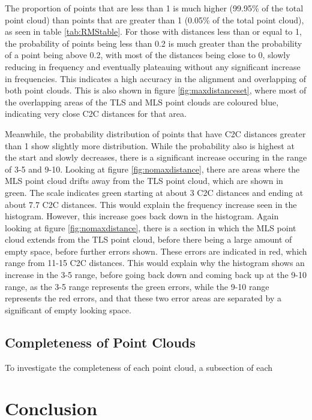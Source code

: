 \documentclass[man]{apa7}
\begin{document}
The proportion of points that are less than 1 is much higher (99.95\% of the total point cloud) than points that are greater than 1 (0.05\% of the total point cloud), as seen in table \ref{tab:RMStable}. For those with distances less than or equal to 1, the probability of points being less than 0.2 is much greater than the probability of a point being above 0.2, with most of the distances being close to 0, slowly reducing in frequency and eventually plateauing without any significant increase in frequencies. This indicates a high accuracy in the alignment and overlapping of both point clouds. This is also shown in figure \ref{fig:maxdistanceset}, where most of the overlapping areas of the TLS and MLS point clouds are coloured blue, indicating very close C2C distances for that area.

Meanwhile, the probability distribution of points that have C2C distances greater than 1 show slightly more distribution. While the probability also is highest at the start and slowly decreases, there is a significant increase occuring in the range of 3-5 and 9-10. Looking at figure \ref{fig:nomaxdistance}, there are areas where the MLS point cloud drifts away from the TLS point cloud, which are shown in green. The scale indicates green starting at about 3 C2C distances and ending at about 7.7 C2C distances. This would explain the frequency increase seen in the histogram. However, this increase goes back down in the histogram. Again looking at figure \ref{fig:nomaxdistance}, there is a section in which the MLS point cloud extends from the TLS point cloud, before there being a large amount of empty space, before further errors shown. These errors are indicated in red, which range from 11-15 C2C distances. This would explain why the histogram shows an increase in the 3-5 range, before going back down and coming back up at the 9-10 range, as the 3-5 range represents the green errors, while the 9-10 range represents the red errors, and that these two error areas are separated by a significant of empty looking space.

\subsection{Completeness of Point Clouds}

To investigate the completeness of each point cloud, a subsection of each 

\newpage
\section{Conclusion}

\printbibliography
\end{document}
